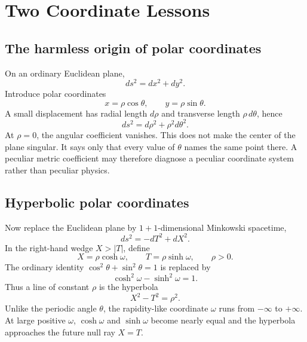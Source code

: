 \section{Two Coordinate Lessons}

\subsection{The harmless origin of polar coordinates}

On an ordinary Euclidean plane,
\begin{equation}
ds^2=dx^2+dy^2.
\end{equation}
Introduce polar coordinates
\begin{equation}
x=\rho\cos\theta,
\qquad
y=\rho\sin\theta .
\end{equation}
A small displacement has radial length \(d\rho\) and transverse length \(\rho\,d\theta\), hence
\begin{equation}
ds^2=d\rho^2+\rho^2d\theta^2.
\label{eq:l03-polar}
\end{equation}
At \(\rho=0\), the angular coefficient vanishes. This does not make the center of the plane singular. It says only that every value of \(\theta\) names the same point there. A peculiar metric coefficient may therefore diagnose a peculiar coordinate system rather than peculiar physics.

\subsection{Hyperbolic polar coordinates}

Now replace the Euclidean plane by \(1+1\)-dimensional Minkowski spacetime,
\begin{equation}
ds^2=-dT^2+dX^2.
\end{equation}
In the right-hand wedge \(X>|T|\), define
\begin{equation}
X=\rho\cosh\omega,
\qquad
T=\rho\sinh\omega,
\qquad \rho>0 .
\label{eq:l03-rindler-transform}
\end{equation}
The ordinary identity \(\cos^2\theta+\sin^2\theta=1\) is replaced by
\begin{equation}
\cosh^2\omega-\sinh^2\omega=1.
\end{equation}
Thus a line of constant \(\rho\) is the hyperbola
\begin{equation}
X^2-T^2=\rho^2.
\end{equation}
Unlike the periodic angle \(\theta\), the rapidity-like coordinate \(\omega\) runs from \(-\infty\) to \(+\infty\). At large positive \(\omega\), \(\cosh\omega\) and \(\sinh\omega\) become nearly equal and the hyperbola approaches the future null ray \(X=T\).

